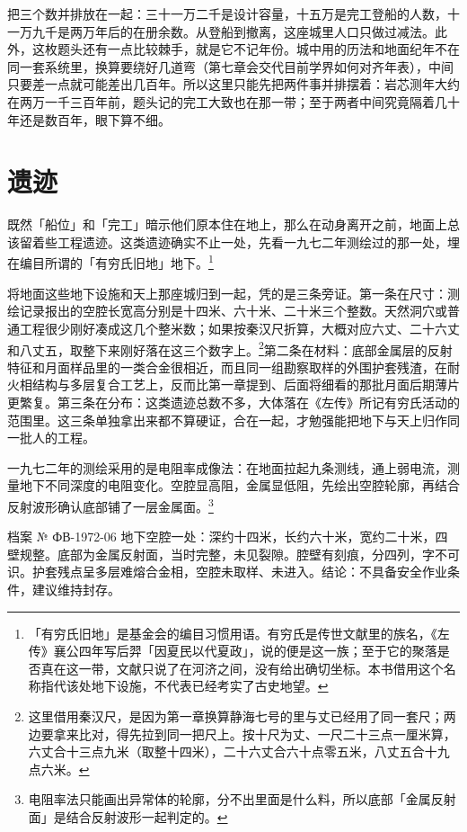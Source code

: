 把三个数并排放在一起：三十一万二千是设计容量，十五万是完工登船的人数，十一万九千是两万年后的在册余数。从登船到撤离，这座城里人口只做过减法。此外，这枚题头还有一点比较棘手，就是它不记年份。城中用的历法和地面纪年不在同一套系统里，换算要绕好几道弯（第七章会交代目前学界如何对齐年表），中间只要差一点就可能差出几百年。所以这里只能先把两件事并排摆着：岩芯测年大约在两万一千三百年前，题头记的完工大致也在那一带；至于两者中间究竟隔着几十年还是数百年，眼下算不细。

\section{遗迹}

既然「船位」和「完工」暗示他们原本住在地上，那么在动身离开之前，地面上总该留着些工程遗迹。这类遗迹确实不止一处，先看一九七二年测绘过的那一处，埋在编目所谓的「有穷氏旧地」地下。\footnote{「有穷氏旧地」是基金会的编目习惯用语。有穷氏是传世文献里的族名，《左传》襄公四年写后羿「因夏民以代夏政」，说的便是这一族；至于它的聚落是否真在这一带，文献只说了在河济之间，没有给出确切坐标。本书借用这个名称指代该处地下设施，不代表已经考实了古史地望。}

将地面这些地下设施和天上那座城归到一起，凭的是三条旁证。第一条在尺寸：测绘记录报出的空腔长宽高分别是十四米、六十米、二十米三个整数。天然洞穴或普通工程很少刚好凑成这几个整米数；如果按秦汉尺折算，大概对应六丈、二十六丈和八丈五，取整下来刚好落在这三个数字上。\footnote{这里借用秦汉尺，是因为第一章换算静海七号的里与丈已经用了同一套尺；两边要拿来比对，得先拉到同一把尺上。按十尺为丈、一尺二十三点一厘米算，六丈合十三点九米（取整十四米），二十六丈合六十点零五米，八丈五合十九点六米。}第二条在材料：底部金属层的反射特征和月面样品里的一类合金很相近，而且同一组勘察取样的外围护套残渣，在耐火相结构与多层复合工艺上，反而比第一章提到、后面将细看的那批月面后期薄片更繁复。第三条在分布：这类遗迹总数不多，大体落在《左传》所记有穷氏活动的范围里。这三条单独拿出来都不算硬证，合在一起，才勉强能把地下与天上归作同一批人的工程。

一九七二年的测绘采用的是电阻率成像法：在地面拉起九条测线，通上弱电流，测量地下不同深度的电阻变化。空腔显高阻，金属显低阻，先绘出空腔轮廓，再结合反射波形确认底部铺了一层金属面。\footnote{电阻率法只能画出异常体的轮廓，分不出里面是什么料，所以底部「金属反射面」是结合反射波形一起判定的。}

\begin{archive}[内部参考]{档案 № ФВ-1972-06}
地下空腔一处：深约十四米，长约六十米，宽约二十米，四壁规整。底部为金属反射面，当时完整，未见裂隙。腔壁有刻痕，分四列，字不可识。护套残点呈多层难熔合金相，空腔未取样、未进入。结论：不具备安全作业条件，建议维持封存。
\end{archive}

